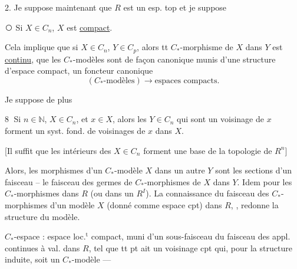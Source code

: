 2. Je suppose maintenant que $R$ est un esp. top  et je suppose

\textcircled{} Si  $X\in C_n$, $X$ est \uline{compact}.

Cela implique que si $X\in C_n$, $Y\in C_p$, alors tt $C_*$-morphisme de $X$ dans $Y$ est \uline{continu}, que les $C_*$-modèles sont de façon canonique munis d'une structure d'espace compact,   un foncteur canonique
\[
(C_*\text{-modèles})\longrightarrow\text{espaces compacts}.
\]

Je suppose de plus

\textcircled{8} Si $n\in\mathbb N$, $X\in C_n$, et $x\in X$, alors 
les $Y\in C_n$ qui  sont un voisinage de $x$  forment un syst. fond. de voisinages de $x$ dans $X$.

[Il suffit que  les intérieurs des $X\in C_n$ forment une base de la topologie de $R^n$]

Alors, les morphismes d'un $C_*$-modèle $X$ dans un autre $Y$ sont les sections d'un faisceau -- le faisceau des germes de $C_*$-morphismes de $X$ dans $Y$.
Idem pour les $C_*$-morphismes dans $R$ (ou dans un $R^I$).
La connaissance du faisceau des $C_*$-morphismes d'un modèle $X$ (donné comme espace cpt) dans $R$, , redonne la structure du modèle.

$C_*$-espace : espace loc.$^{\mathrm t}$ compact, muni d'un sous-faisceau du faisceau des appl. continues à val. dans $R$, tel que tt pt ait un voisinage cpt qui, pour la structure induite, soit un $C_*$-modèle ---

